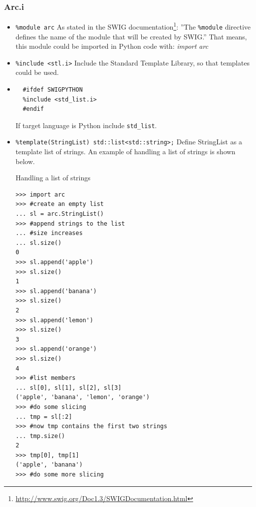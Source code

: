 \documentclass{article}
\begin{document}
\subsubsection{Arc.i}
\label{iArc}
\begin{flushleft}
\begin{itemize}
  \item{\verb$%module arc$} \linebreak
    As stated in the SWIG documentation\footnote{\url{http://www.swig.org/Doc1.3/SWIGDocumentation.html}}: ''The \verb$%module$ directive defines the name of the module that will be created by SWIG.''
    That means, this module could be imported in Python code with: \textit{import arc}
\end{itemize}
\begin{itemize}
  \item{\verb$%include <stl.i>$} \linebreak
    Include the Standard Template Library, so that templates could be used.
\end{itemize}
\begin{itemize}
  \item{
\begin{verbatim}
  #ifdef SWIGPYTHON
  %include <std_list.i>
  #endif\end{verbatim}
    If target language is Python include \verb$std_list$.
  } \linebreak
\end{itemize}
\begin{itemize}
  \item{\verb$%template(StringList) std::list<std::string>;$\linebreak
    Define StringList as a template list of strings. An example of handling a list of strings is shown below. \linebreak
    \begin{example}
      \caption{Handling a list of strings}\label{listex}
\begin{verbatim}
>>> import arc
>>> #create an empty list
... sl = arc.StringList()
>>> #append strings to the list
... #size increases
... sl.size()
0
>>> sl.append('apple')
>>> sl.size()
1
>>> sl.append('banana')
>>> sl.size()
2
>>> sl.append('lemon')
>>> sl.size()
3
>>> sl.append('orange')
>>> sl.size()
4
>>> #list members
... sl[0], sl[1], sl[2], sl[3]
('apple', 'banana', 'lemon', 'orange')
>>> #do some slicing
... tmp = sl[:2]
>>> #now tmp contains the first two strings
... tmp.size()
2
>>> tmp[0], tmp[1]
('apple', 'banana')
>>> #do some more slicing

\end{verbatim}
\end{example}}
\end{itemize}
\end{flushleft}
\end{document}

